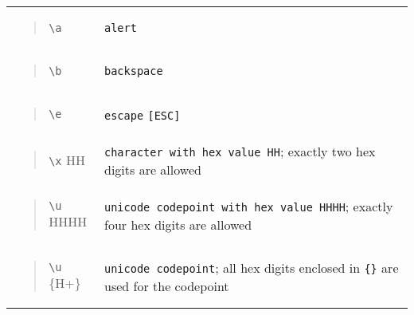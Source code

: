 \begin{longtable}[]{@{}ll@{}}
\begin{minipage}[t]{0.47\columnwidth}
\begin{quote}
\texttt{\textbackslash{}a}
\end{quote}\strut
\end{minipage} & \begin{minipage}[t]{0.47\columnwidth}\raggedright
\texttt{alert}\strut
\end{minipage}\tabularnewline
\begin{minipage}[t]{0.47\columnwidth}\raggedright
\begin{quote}
\texttt{\textbackslash{}b}
\end{quote}\strut
\end{minipage} & \begin{minipage}[t]{0.47\columnwidth}\raggedright
\texttt{backspace}\strut
\end{minipage}\tabularnewline
\begin{minipage}[t]{0.47\columnwidth}\raggedright
\begin{quote}
\texttt{\textbackslash{}e}
\end{quote}\strut
\end{minipage} & \begin{minipage}[t]{0.47\columnwidth}\raggedright
\texttt{escape} \texttt{{[}ESC{]}}\strut
\end{minipage}\tabularnewline
\begin{minipage}[t]{0.47\columnwidth}\raggedright
\begin{quote}
\texttt{\textbackslash{}x} HH
\end{quote}\strut
\end{minipage} & \begin{minipage}[t]{0.47\columnwidth}\raggedright
\texttt{character\ with\ hex\ value\ HH}; exactly two hex digits are
allowed\strut
\end{minipage}\tabularnewline
\begin{minipage}[t]{0.47\columnwidth}\raggedright
\begin{quote}
\texttt{\textbackslash{}u} HHHH
\end{quote}\strut
\end{minipage} & \begin{minipage}[t]{0.47\columnwidth}\raggedright
\texttt{unicode\ codepoint\ with\ hex\ value\ HHHH}; exactly four hex
digits are allowed\strut
\end{minipage}\tabularnewline
\begin{minipage}[t]{0.47\columnwidth}\raggedright
\begin{quote}
\texttt{\textbackslash{}u} \{H+\}
\end{quote}\strut
\end{minipage} & \begin{minipage}[t]{0.47\columnwidth}\raggedright
\texttt{unicode\ codepoint}; all hex digits enclosed in \texttt{\{\}}
are used for the codepoint\strut
\end{minipage}\tabularnewline
\bottomrule
\end{longtable}

